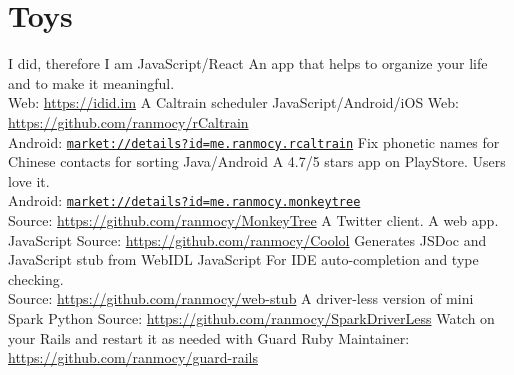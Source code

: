 \documentclass[]{friggeri-cv} %
\begin{document}

\section{Toys}

\begin{entrylist}
  {I did, therefore I am}
  {JavaScript/React}
  {
    An app that helps to organize your life and to make it meaningful.\\
    Web: \url{https://idid.im}
  }
  {A Caltrain scheduler}
  {JavaScript/Android/iOS}
  {
    Web: \url{https://github.com/ranmocy/rCaltrain}\\
    Android: \href{https://play.google.com/store/apps/details?id=me.ranmocy.rcaltrain}{\texttt{market://details?id=me.ranmocy.rcaltrain}}
  }
  {Fix phonetic names for Chinese contacts for sorting}
  {Java/Android}
  {
    A 4.7/5 stars app on PlayStore. Users love it.\\
    Android: \href{https://play.google.com/store/apps/details?id=me.ranmocy.monkeytree}{\texttt{market://details?id=me.ranmocy.monkeytree}}\\
    Source: \url{https://github.com/ranmocy/MonkeyTree}
  }
  {A Twitter client. A web app.}
  {JavaScript}
  {
    Source: \url{https://github.com/ranmocy/Coolol}
  }
  {Generates JSDoc and JavaScript stub from WebIDL}
  {JavaScript}
  {
    For IDE auto-completion and type checking.\\
    Source: \url{https://github.com/ranmocy/web-stub}
  }
  {A driver-less version of mini Spark}
  {Python}
  {
    Source: \url{https://github.com/ranmocy/SparkDriverLess}
  }
  {Watch on your Rails and restart it as needed with Guard}
  {Ruby}
  {
    Maintainer: \url{https://github.com/ranmocy/guard-rails}
  }
\end{entrylist}
\end{document}

